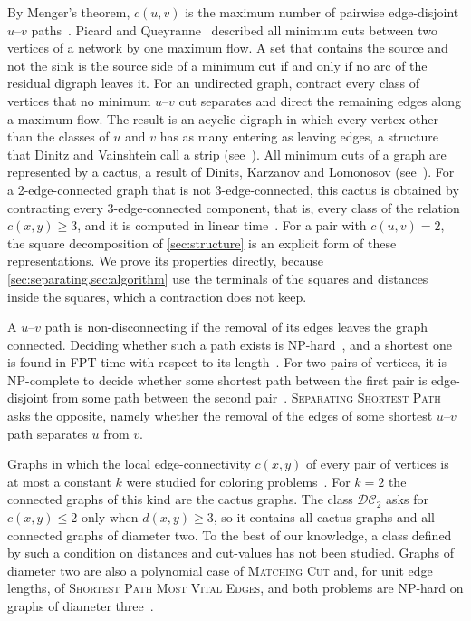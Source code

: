 \documentclass[pdflatex,sn-mathphys-num]{sn-jnl}%
\theoremstyle{thmstyleone}%
\theoremstyle{thmstyletwo}%
\theoremstyle{thmstylethree}%
\newcommand{\DC}{\mathcal{DC}_2}%
\newcommand{\SSP}{\textsc{Separating Shortest Path}}%
\begin{document}
By Menger's theorem, $c(u, v)$ is the maximum number of pairwise edge-disjoint $u$--$v$ paths~\cite[Corollary~3.3.5]{Diestel2025}.
Picard and Queyranne~\cite{PicardQueyranne1980} described all minimum cuts between two vertices of a network by one maximum flow.
A set that contains the source and not the sink is the source side of a minimum cut if and only if no arc of the residual digraph leaves it.
For an undirected graph, contract every class of vertices that no minimum $u$--$v$ cut separates and direct the remaining edges along a maximum flow.
The result is an acyclic digraph in which every vertex other than the classes of $u$ and $v$ has as many entering as leaving edges, a structure that Dinitz and Vainshtein call a strip (see~\cite{BaswanaPandey2025Carcass}).
All minimum cuts of a graph are represented by a cactus, a result of Dinits, Karzanov and Lomonosov (see~\cite{NagamochiKameda1996}).
For a 2-edge-connected graph that is not 3-edge-connected, this cactus is obtained by contracting every 3-edge-connected component, that is, every class of the relation $c(x, y) \geq 3$, and it is computed in linear time~\cite{Mehlhorn2017Certifying}.
For a pair with $c(u, v) = 2$, the square decomposition of \cref{sec:structure} is an explicit form of these representations.
We prove its properties directly, because \cref{sec:separating,sec:algorithm} use the terminals of the squares and distances inside the squares, which a contraction does not keep.

A $u$--$v$ path is non-disconnecting if the removal of its edges leaves the graph connected.
Deciding whether such a path exists is NP-hard~\cite{Mao2021NonSeparating}, and a shortest one is found in FPT time with respect to its length~\cite{Abhinav2022NonSeparating}.
For two pairs of vertices, it is NP-complete to decide whether some shortest path between the first pair is edge-disjoint from some path between the second pair~\cite{EilamTzoreff1998Disjoint}.
\SSP{} asks the opposite, namely whether the removal of the edges of some shortest $u$--$v$ path separates $u$ from $v$.

Graphs in which the local edge-connectivity $c(x, y)$ of every pair of vertices is at most a constant $k$ were studied for coloring problems~\cite{Aboulker2017Coloring}.
For $k = 2$ the connected graphs of this kind are the cactus graphs.
The class $\DC$ asks for $c(x, y) \leq 2$ only when $d(x, y) \geq 3$, so it contains all cactus graphs and all connected graphs of diameter two.
To the best of our knowledge, a class defined by such a condition on distances and cut-values has not been studied.
Graphs of diameter two are also a polynomial case of \textsc{Matching Cut} and, for unit edge lengths, of \textsc{Shortest Path Most Vital Edges}, and both problems are NP-hard on graphs of diameter three~\cite{LeLe2019MatchingCut,Bazgan2019MostVital}.
\end{document}
